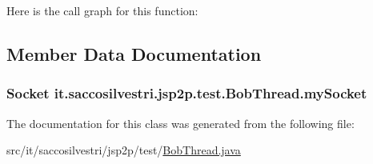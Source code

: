 \-Here is the call graph for this function\-:




\subsection{\-Member \-Data \-Documentation}
\hypertarget{classit_1_1saccosilvestri_1_1jsp2p_1_1test_1_1_bob_thread_ad788d045c926c3c835dbadc54e3d0c12}{
\subsubsection[{my\-Socket}]{\setlength{\rightskip}{0pt plus 5cm}\-Socket {\bf it.\-saccosilvestri.\-jsp2p.\-test.\-Bob\-Thread.\-my\-Socket}}}
\label{classit_1_1saccosilvestri_1_1jsp2p_1_1test_1_1_bob_thread_ad788d045c926c3c835dbadc54e3d0c12}


\-The documentation for this class was generated from the following file\-:\begin{DoxyCompactItemize}
\item 
src/it/saccosilvestri/jsp2p/test/\hyperlink{_bob_thread_8java}{\-Bob\-Thread.\-java}\end{DoxyCompactItemize}

